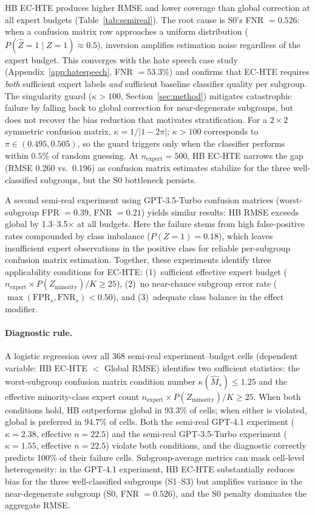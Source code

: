 HB EC-HTE produces higher RMSE and lower coverage than global correction at all expert budgets (Table~\ref{tab:semireal}).
The root cause is S0's FNR $= 0.526$: when a confusion matrix row approaches a uniform distribution ($P(\hat{Z}{=}1 \mid Z{=}1) \approx 0.5$), inversion amplifies estimation noise regardless of the expert budget.
This converges with the hate speech case study (Appendix~\ref{app:hatespeech}, FNR $= 53.3$\%) and confirms that EC-HTE requires \emph{both} sufficient expert labels \emph{and} sufficient baseline classifier quality per subgroup.
The singularity guard ($\kappa > 100$, Section~\ref{sec:method}) mitigates catastrophic failure by falling back to global correction for near-degenerate subgroups, but does not recover the bias reduction that motivates stratification.
For a $2 \times 2$ symmetric confusion matrix, $\kappa = 1/|1-2\pi|$; $\kappa > 100$ corresponds to $\pi \in (0.495, 0.505)$, so the guard triggers only when the classifier performs within $0.5\%$ of random guessing.
At $n_{\text{expert}} = 500$, HB EC-HTE narrows the gap (RMSE 0.260 vs.\ 0.196) as confusion matrix estimates stabilize for the three well-classified subgroups, but the S0 bottleneck persists.

A second semi-real experiment using GPT-3.5-Turbo confusion matrices (worst-subgroup FPR $= 0.39$, FNR $= 0.21$) yields similar results: HB RMSE exceeds global by 1.3--3.5$\times$ at all budgets.
Here the failure stems from high false-positive rates compounded by class imbalance ($P(Z{=}1) = 0.18$), which leaves insufficient expert observations in the positive class for reliable per-subgroup confusion matrix estimation.
Together, these experiments identify three applicability conditions for EC-HTE: (1)~sufficient effective expert budget ($n_{\text{expert}} \times P(Z_{\text{minority}}) / K \geq 25$), (2)~no near-chance subgroup error rate ($\max(\mathrm{FPR}_s, \mathrm{FNR}_s) < 0.50$), and (3)~adequate class balance in the effect modifier.

\paragraph{Diagnostic rule.}
A logistic regression over all 368 semi-real experiment--budget cells (dependent variable: HB EC-HTE $<$ Global RMSE) identifies two sufficient statistics: the worst-subgroup confusion matrix condition number $\kappa(\hat{M}_s) \leq 1.25$ and the effective minority-class expert count $n_{\text{expert}} \times P(Z_{\text{minority}}) / K \geq 25$.
When both conditions hold, HB outperforms global in 93.3\% of cells; when either is violated, global is preferred in 94.7\% of cells.
Both the semi-real GPT-4.1 experiment ($\kappa = 2.38$, effective $n = 22.5$) and the semi-real GPT-3.5-Turbo experiment ($\kappa = 1.55$, effective $n = 22.5$) violate both conditions, and the diagnostic correctly predicts 100\% of their failure cells.
Subgroup-average metrics can mask cell-level heterogeneity: in the GPT-4.1 experiment, HB EC-HTE substantially reduces bias for the three well-classified subgroups (S1--S3) but amplifies variance in the near-degenerate subgroup (S0, FNR $= 0.526$), and the S0 penalty dominates the aggregate RMSE.

